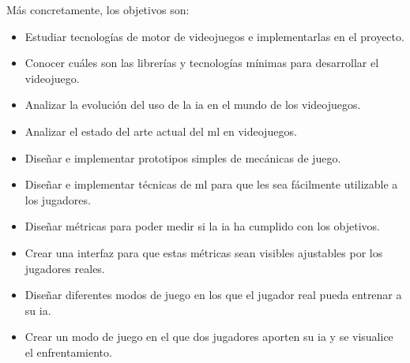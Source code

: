 Más concretamente, los objetivos son:
\begin{itemize}
	\item Estudiar tecnologías de motor de videojuegos e implementarlas en el proyecto.
	\item Conocer cuáles son las librerías y tecnologías mínimas para desarrollar el videojuego.
	\item Analizar la evolución del uso de la \gls{ia} en el mundo de los videojuegos.
	\item Analizar el estado del arte actual del \gls{ml} en videojuegos.
	\item Diseñar e implementar prototipos simples de mecánicas de juego.
	\item Diseñar e implementar técnicas de \gls{ml} para que les sea fácilmente utilizable a los jugadores.
	\item Diseñar métricas para poder medir si la \gls{ia} ha cumplido con los objetivos.
	\item Crear una interfaz para que estas métricas sean visibles ajustables por los jugadores reales.
	\item Diseñar diferentes modos de juego en los que el jugador real pueda entrenar a su \gls{ia}.
	\item Crear un modo de juego en el que dos jugadores aporten su \gls{ia} y se visualice el enfrentamiento.
\end{itemize}